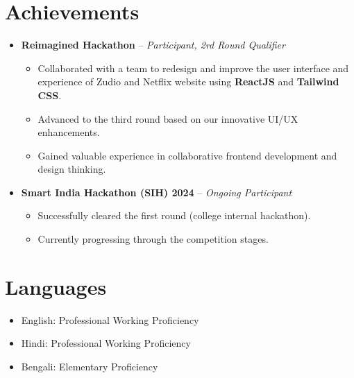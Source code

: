 \documentclass[letterpaper,11pt]{article}
\begin{document}

\section{\textbf{Achievements}}
\begin{itemize}[leftmargin=*, itemsep=-2pt]
    \item \textbf{Reimagined Hackathon} – \textit{Participant, 2rd Round Qualifier}
    \begin{itemize}
        \item Collaborated with a team to redesign and improve the user interface and experience of  Zudio  and Netflix website using \textbf{ReactJS} and \textbf{Tailwind CSS}.
        \item Advanced to the third round based on our innovative UI/UX enhancements.
        \item Gained valuable experience in collaborative frontend development and design thinking.
    \end{itemize}
    \item \textbf{Smart India Hackathon (SIH) 2024} – \textit{Ongoing Participant}
    \begin{itemize}
        \item Successfully cleared the first round (college internal hackathon).
        \item Currently progressing through the competition stages.
    \end{itemize}
\end{itemize}



\section{\textbf{Languages}}
\begin{itemize}[leftmargin=*, itemsep=-2pt]
    \item English: Professional Working Proficiency
    \item Hindi: Professional Working Proficiency
    \item Bengali: Elementary Proficiency
\end{itemize}
\end{document}
